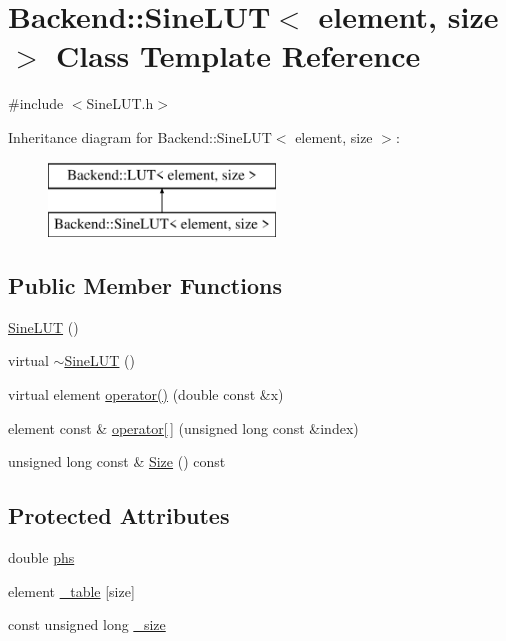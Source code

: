 \hypertarget{classBackend_1_1SineLUT}{\section{Backend\+:\+:Sine\+L\+U\+T$<$ element, size $>$ Class Template Reference}
\label{classBackend_1_1SineLUT}
}


{\ttfamily \#include $<$Sine\+L\+U\+T.\+h$>$}

Inheritance diagram for Backend\+:\+:Sine\+L\+U\+T$<$ element, size $>$\+:\begin{figure}[H]
\begin{center}
\leavevmode
\includegraphics[height=2.000000cm]{classBackend_1_1SineLUT}
\end{center}
\end{figure}
\subsection*{Public Member Functions}
\begin{DoxyCompactItemize}
\item 
\hyperlink{classBackend_1_1SineLUT_ab2784ed19d66ee885ffe23f3ef9d2214}{Sine\+L\+U\+T} ()
\item 
virtual \hyperlink{classBackend_1_1SineLUT_aeb5493bee1755391cea3690c31b1665b}{$\sim$\+Sine\+L\+U\+T} ()
\item 
virtual element \hyperlink{classBackend_1_1SineLUT_a461395dab282ae8ac9b517caf2d6a553}{operator()} (double const \&x)
\item 
element const \& \hyperlink{classBackend_1_1LUT_a9a7c75f36c72778098a091db3269c29c}{operator\mbox{[}$\,$\mbox{]}} (unsigned long const \&index)
\item 
unsigned long const \& \hyperlink{classBackend_1_1LUT_a3ab84f04569e89cd6046da599c6edbae}{Size} () const 
\end{DoxyCompactItemize}
\subsection*{Protected Attributes}
\begin{DoxyCompactItemize}
\item 
double \hyperlink{classBackend_1_1SineLUT_af5d1e8bc8bda7d41272c17e0f2e9aad8}{phs}
\item 
element \hyperlink{classBackend_1_1LUT_ae70f3f0c9aaa9e0b85517d8e2c61d9a5}{\+\_\+table} \mbox{[}size\mbox{]}
\item 
const unsigned long \hyperlink{classBackend_1_1LUT_a94d2ce1a7c644ce2d4f8e905790b9b54}{\+\_\+size}
\end{DoxyCompactItemize}


